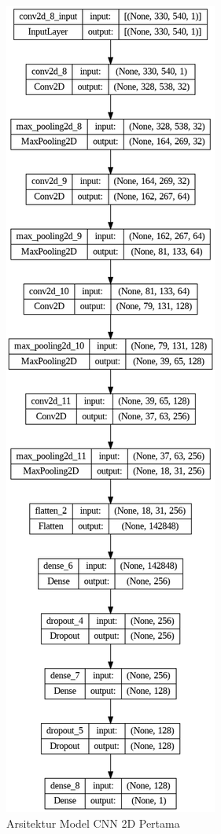   \begin{figure} [H] \centering
    \includegraphics[scale=0.4]{gambar/bab3/cnnarc1.png}
    \caption{Arsitektur Model CNN 2D Pertama}
    \label{fig:cnnarc1}
  \end{figure}

